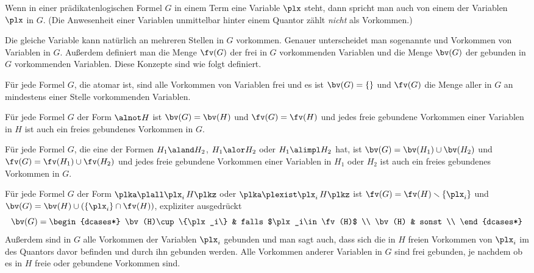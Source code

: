 Wenn in einer prädikatenlogischen Formel $G$ in einem Term eine
Variable $\plx$ steht, dann spricht man auch von einem
%
 der Variablen $\plx$ in
$G$.
%
(Die Anwesenheit einer Variablen unmittelbar hinter einem Quantor
zählt \emph{nicht} als Vorkommen.)

Die gleiche Variable kann natürlich an mehreren Stellen in $G$
vorkommen.
%
Genauer unterscheidet man sogenannte 
und  Vorkommen von Variablen
in $G$.
%
Außerdem definiert man die Menge $\fv(G)$ der frei in $G$ vorkommenden
Variablen und die Menge $\bv(G)$ der gebunden in $G$ vorkommenden
Variablen.
%
Diese Konzepte sind wie folgt definiert.

Für jede Formel $G$, die atomar ist, sind alle Vorkommen von
Variablen frei und es ist $\bv(G)=\{\}$ und $\fv(G)$ die Menge aller
in $G$ an mindestens einer Stelle vorkommenden Variablen.

Für jede Formel $G$ der Form $\alnot H$ ist $\bv(G)=\bv(H)$ und
$\fv(G)=\fv(H)$ und jedes freie \bzw gebundene Vorkommen einer
Variablen in $H$ ist auch ein freies \bzw gebundenes Vorkommen in $G$.

Für jede Formel $G$, die eine der Formen $H_1\aland H_2$,
$H_1\alor H_2$ oder $H_1\alimpl H_2$ hat, ist
$\bv(G)=\bv(H_1)\cup \bv(H_2)$ und  $\fv(G)=\fv(H_1)\cup \fv(H_2)$ und
jedes freie \bzw gebundene Vorkommen einer Variablen in $H_1$ oder
$H_2$ ist auch ein freies \bzw gebundenes Vorkommen in $G$.

Für jede Formel $G$ der Form $\plka \plall \plx_i \, H\plkz$ oder
$\plka \plexist \plx_i \, H\plkz$ ist
$\fv(G)=\fv(H)\smallsetminus\{\plx_i\}$ und
$\bv(G)=\bv(H)\cup\left( \{\plx_i\} \cap \fv(H)\right)$, \dh
expliziter ausgedrückt
\[
\bv(G)=\begin{dcases*}
  \bv(H)\cup \{\plx_i\} & falls $\plx_i\in\fv(H)$ \\
  \bv(H) & sonst \\
\end{dcases*}
\]
%
Außerdem sind in $G$ alle Vorkommen der Variablen $\plx_i$ gebunden
und man sagt auch, dass sich die in $H$ freien Vorkommen von $\plx_i$
im %
des Quantors davor befinden und durch ihn gebunden werden.
%
Alle Vorkommen anderer Variablen in $G$ sind frei \bzw gebunden, je
nachdem ob es in $H$ freie oder gebundene Vorkommen  sind.

